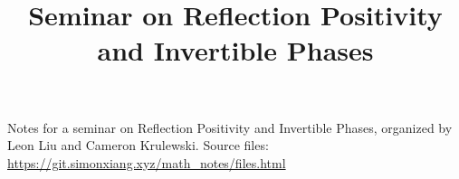 \documentclass[fontsize=9pt]{article}
\title{Seminar on Reflection Positivity and Invertible Phases}
\begin{document}
\maketitle
Notes for a seminar on Reflection Positivity and Invertible Phases, organized by Leon Liu and Cameron Krulewski. Source files: \url{https://git.simonxiang.xyz/math_notes/files.html}

\tableofcontents
\newpage
    
\end{document}

